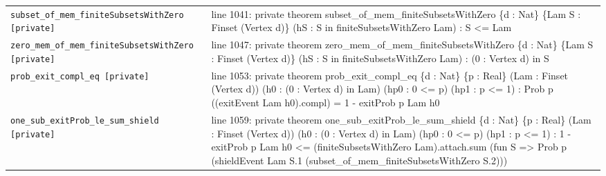 \documentclass[10pt]{article}
\begin{document}
\begin{longtable}{>{\raggedright\arraybackslash}p{} >{\raggedright\arraybackslash}p{}}
\texttt{subset\_\allowbreak{}of\_\allowbreak{}mem\_\allowbreak{}finiteSubsetsWithZero [private]} & {\ttfamily\scriptsize line 1041:\allowbreak{} private theorem subset\_\allowbreak{}of\_\allowbreak{}mem\_\allowbreak{}finiteSubsetsWithZero \{d :\allowbreak{} Nat\} \{Lam S :\allowbreak{} Finset (\allowbreak{}Vertex d)\allowbreak{}\} (\allowbreak{}hS :\allowbreak{} S in finiteSubsetsWithZero Lam)\allowbreak{} :\allowbreak{} S <=\allowbreak{} Lam} \\[0.45em]
\texttt{zero\_\allowbreak{}mem\_\allowbreak{}of\_\allowbreak{}mem\_\allowbreak{}finiteSubsetsWithZero [private]} & {\ttfamily\scriptsize line 1047:\allowbreak{} private theorem zero\_\allowbreak{}mem\_\allowbreak{}of\_\allowbreak{}mem\_\allowbreak{}finiteSubsetsWithZero \{d :\allowbreak{} Nat\} \{Lam S :\allowbreak{} Finset (\allowbreak{}Vertex d)\allowbreak{}\} (\allowbreak{}hS :\allowbreak{} S in finiteSubsetsWithZero Lam)\allowbreak{} :\allowbreak{} (\allowbreak{}0 :\allowbreak{} Vertex d)\allowbreak{} in S} \\[0.45em]
\texttt{prob\_\allowbreak{}exit\_\allowbreak{}compl\_\allowbreak{}eq [private]} & {\ttfamily\scriptsize line 1053:\allowbreak{} private theorem prob\_\allowbreak{}exit\_\allowbreak{}compl\_\allowbreak{}eq \{d :\allowbreak{} Nat\} \{p :\allowbreak{} Real\} (\allowbreak{}Lam :\allowbreak{} Finset (\allowbreak{}Vertex d)\allowbreak{})\allowbreak{} (\allowbreak{}h0 :\allowbreak{} (\allowbreak{}0 :\allowbreak{} Vertex d)\allowbreak{} in Lam)\allowbreak{} (\allowbreak{}hp0 :\allowbreak{} 0 <=\allowbreak{} p)\allowbreak{} (\allowbreak{}hp1 :\allowbreak{} p <=\allowbreak{} 1)\allowbreak{} :\allowbreak{} Prob p (\allowbreak{}(\allowbreak{}exitEvent Lam h0)\allowbreak{}.\allowbreak{}compl)\allowbreak{} =\allowbreak{} 1 -\allowbreak{} exitProb p Lam h0} \\[0.45em]
\texttt{one\_\allowbreak{}sub\_\allowbreak{}exitProb\_\allowbreak{}le\_\allowbreak{}sum\_\allowbreak{}shield [private]} & {\ttfamily\scriptsize line 1059:\allowbreak{} private theorem one\_\allowbreak{}sub\_\allowbreak{}exitProb\_\allowbreak{}le\_\allowbreak{}sum\_\allowbreak{}shield \{d :\allowbreak{} Nat\} \{p :\allowbreak{} Real\} (\allowbreak{}Lam :\allowbreak{} Finset (\allowbreak{}Vertex d)\allowbreak{})\allowbreak{} (\allowbreak{}h0 :\allowbreak{} (\allowbreak{}0 :\allowbreak{} Vertex d)\allowbreak{} in Lam)\allowbreak{} (\allowbreak{}hp0 :\allowbreak{} 0 <=\allowbreak{} p)\allowbreak{} (\allowbreak{}hp1 :\allowbreak{} p <=\allowbreak{} 1)\allowbreak{} :\allowbreak{} 1 -\allowbreak{} exitProb p Lam h0 <=\allowbreak{} (\allowbreak{}finiteSubsetsWithZero Lam)\allowbreak{}.\allowbreak{}attach.\allowbreak{}sum (\allowbreak{}fun S =\allowbreak{}> Prob p (\allowbreak{}shieldEvent Lam S.\allowbreak{}1 (\allowbreak{}subset\_\allowbreak{}of\_\allowbreak{}mem\_\allowbreak{}finiteSubsetsWithZero S.\allowbreak{}2)\allowbreak{})\allowbreak{})\allowbreak{}} \\[0.45em]

\end{longtable}
\end{document}
